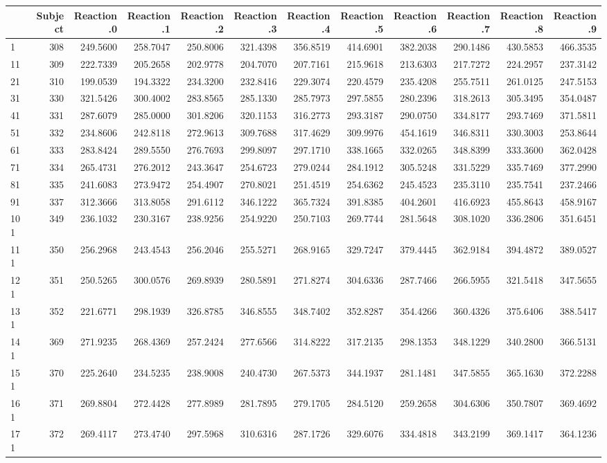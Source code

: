 \documentclass[
]{article}
\begin{document}
\begin{longtable}[]{@{}lrrrrrrrrrrr@{}}
\toprule
& Subject & Reaction.0 & Reaction.1 & Reaction.2 & Reaction.3 &
Reaction.4 & Reaction.5 & Reaction.6 & Reaction.7 & Reaction.8 &
Reaction.9\tabularnewline
\midrule
\endhead
1 & 308 & 249.5600 & 258.7047 & 250.8006 & 321.4398 & 356.8519 &
414.6901 & 382.2038 & 290.1486 & 430.5853 & 466.3535\tabularnewline
11 & 309 & 222.7339 & 205.2658 & 202.9778 & 204.7070 & 207.7161 &
215.9618 & 213.6303 & 217.7272 & 224.2957 & 237.3142\tabularnewline
21 & 310 & 199.0539 & 194.3322 & 234.3200 & 232.8416 & 229.3074 &
220.4579 & 235.4208 & 255.7511 & 261.0125 & 247.5153\tabularnewline
31 & 330 & 321.5426 & 300.4002 & 283.8565 & 285.1330 & 285.7973 &
297.5855 & 280.2396 & 318.2613 & 305.3495 & 354.0487\tabularnewline
41 & 331 & 287.6079 & 285.0000 & 301.8206 & 320.1153 & 316.2773 &
293.3187 & 290.0750 & 334.8177 & 293.7469 & 371.5811\tabularnewline
51 & 332 & 234.8606 & 242.8118 & 272.9613 & 309.7688 & 317.4629 &
309.9976 & 454.1619 & 346.8311 & 330.3003 & 253.8644\tabularnewline
61 & 333 & 283.8424 & 289.5550 & 276.7693 & 299.8097 & 297.1710 &
338.1665 & 332.0265 & 348.8399 & 333.3600 & 362.0428\tabularnewline
71 & 334 & 265.4731 & 276.2012 & 243.3647 & 254.6723 & 279.0244 &
284.1912 & 305.5248 & 331.5229 & 335.7469 & 377.2990\tabularnewline
81 & 335 & 241.6083 & 273.9472 & 254.4907 & 270.8021 & 251.4519 &
254.6362 & 245.4523 & 235.3110 & 235.7541 & 237.2466\tabularnewline
91 & 337 & 312.3666 & 313.8058 & 291.6112 & 346.1222 & 365.7324 &
391.8385 & 404.2601 & 416.6923 & 455.8643 & 458.9167\tabularnewline
101 & 349 & 236.1032 & 230.3167 & 238.9256 & 254.9220 & 250.7103 &
269.7744 & 281.5648 & 308.1020 & 336.2806 & 351.6451\tabularnewline
111 & 350 & 256.2968 & 243.4543 & 256.2046 & 255.5271 & 268.9165 &
329.7247 & 379.4445 & 362.9184 & 394.4872 & 389.0527\tabularnewline
121 & 351 & 250.5265 & 300.0576 & 269.8939 & 280.5891 & 271.8274 &
304.6336 & 287.7466 & 266.5955 & 321.5418 & 347.5655\tabularnewline
131 & 352 & 221.6771 & 298.1939 & 326.8785 & 346.8555 & 348.7402 &
352.8287 & 354.4266 & 360.4326 & 375.6406 & 388.5417\tabularnewline
141 & 369 & 271.9235 & 268.4369 & 257.2424 & 277.6566 & 314.8222 &
317.2135 & 298.1353 & 348.1229 & 340.2800 & 366.5131\tabularnewline
151 & 370 & 225.2640 & 234.5235 & 238.9008 & 240.4730 & 267.5373 &
344.1937 & 281.1481 & 347.5855 & 365.1630 & 372.2288\tabularnewline
161 & 371 & 269.8804 & 272.4428 & 277.8989 & 281.7895 & 279.1705 &
284.5120 & 259.2658 & 304.6306 & 350.7807 & 369.4692\tabularnewline
171 & 372 & 269.4117 & 273.4740 & 297.5968 & 310.6316 & 287.1726 &
329.6076 & 334.4818 & 343.2199 & 369.1417 & 364.1236\tabularnewline
\bottomrule
\end{longtable}
\end{document}
